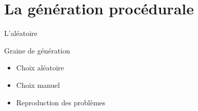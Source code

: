 \documentclass{beamer}
\begin{document}
{\section{La génération procédurale}
\begin{frame}{L'al\'eatoire}
    \begin{block}{Graine de génération}
        \begin{itemize}
            \item[\bullet] Choix aléatoire
            \item[\bullet] Choix manuel
            \item[\bullet] Reproduction des problèmes
        \end{itemize}
    \end{block}
\end{frame}

}
\end{document}
